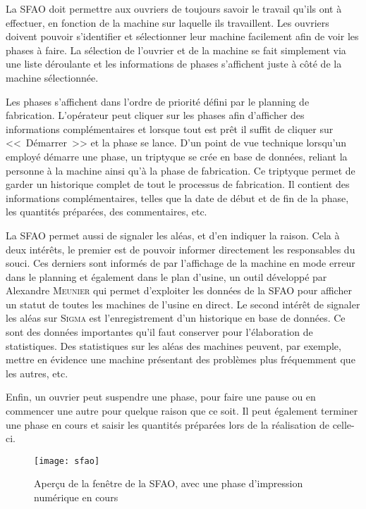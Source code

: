 La SFAO doit permettre aux ouvriers de toujours savoir le travail qu'ils ont à effectuer, en fonction de la machine sur laquelle ils travaillent.
Les ouvriers doivent pouvoir s'identifier et sélectionner leur machine facilement afin de voir les phases à faire.
La sélection de l'ouvrier et de la machine se fait simplement via une liste déroulante et les informations de phases s'affichent juste à côté de la machine sélectionnée.

Les phases s'affichent dans l'ordre de priorité défini par le planning de fabrication.
L'opérateur peut cliquer sur les phases afin d'afficher des informations complémentaires et lorsque tout est prêt il suffit de cliquer sur <<~Démarrer~>> et la phase se lance.
D'un point de vue technique lorsqu'un employé démarre une phase, un triptyque se crée en base de données, reliant la personne à la machine ainsi qu'à la phase de fabrication.
Ce triptyque permet de garder un historique complet de tout le processus de fabrication.
Il contient des informations complémentaires, telles que la date de début et de fin de la phase, les quantités préparées, des commentaires, etc.

La SFAO permet aussi de signaler les aléas, et d'en indiquer la raison.
Cela à deux intérêts, le premier est de pouvoir informer directement les responsables du souci.
Ces derniers sont informés de par l'affichage de la machine en mode erreur dans le planning et également dans le plan d'usine, un outil développé par Alexandre \textsc{Meunier} qui permet d'exploiter les données de la SFAO pour afficher un statut de toutes les machines de l'usine en direct.
Le second intérêt de signaler les aléas sur \textsc{Sigma} est l'enregistrement d'un historique en base de données.
Ce sont des données importantes qu'il faut conserver pour l'élaboration de statistiques.
Des statistiques sur les aléas des machines peuvent, par exemple, mettre en évidence une machine présentant des problèmes plus fréquemment que les autres, etc.

Enfin, un ouvrier peut suspendre une phase, pour faire une pause ou en commencer une autre pour quelque raison que ce soit.
Il peut également terminer une phase en cours et saisir les quantités préparées lors de la réalisation de celle-ci.

\FloatBarrier
\begin{figure}[h!]
    \begin{center}
        \texttt{[image: sfao]}
    \end{center}
    \caption{Aperçu de la fenêtre de la SFAO, avec une phase d'impression numérique en cours}
    \label{figure:sfao}
\end{figure}
\FloatBarrier

